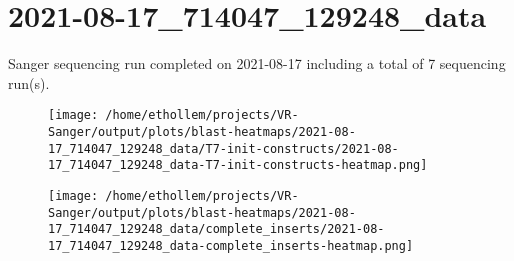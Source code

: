 \section{2021-08-17\_714047\_129248\_data}

    Sanger sequencing run completed on 2021-08-17
    including a total of 7 sequencing
    run(s).
    

    \begin{figure}[!h]
        \texttt{[image: /home/ethollem/projects/VR-Sanger/output/plots/blast-heatmaps/2021-08-17\_714047\_129248\_data/T7-init-constructs/2021-08-17\_714047\_129248\_data-T7-init-constructs-heatmap.png]}
        \centering
    \end{figure}


    \begin{figure}[!h]
        \texttt{[image: /home/ethollem/projects/VR-Sanger/output/plots/blast-heatmaps/2021-08-17\_714047\_129248\_data/complete\_inserts/2021-08-17\_714047\_129248\_data-complete\_inserts-heatmap.png]}
        \centering
    \end{figure}

\pagebreak